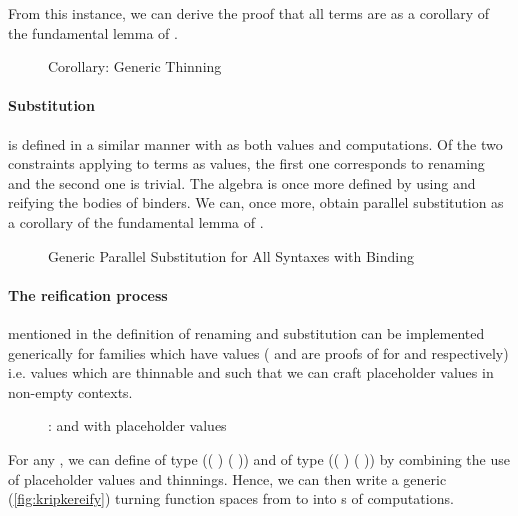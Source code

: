 From this instance, we can derive the proof that all terms are  as
a corollary of the fundamental lemma of .

\begin{figure}[h]
\caption{Corollary: Generic Thinning\label{fig:genren}}
\end{figure}

\paragraph{Substitution} is defined in a similar manner with  as both values and computations.
Of the two constraints applying to terms as values, the first one corresponds to renaming
and the second one is trivial. The algebra is once more defined by using  and
reifying the bodies of binders. We can, once more, obtain parallel substitution as a
corollary of the fundamental lemma of .

\begin{figure}[h]
\caption{Generic Parallel Substitution for All Syntaxes with Binding\label{fig:gensub}}
\end{figure}

\paragraph{The reification process} mentioned in the definition of renaming and substitution
can be implemented generically for  families which have 
values ( and  are proofs of
 for  and  respectively) i.e. values which are thinnable
and such that we can craft placeholder values in non-empty contexts.

\begin{figure}[h]
\caption{:  and with placeholder values}
\end{figure}

For any  , we can define  of
type {(( )  ( \AF{++} ))} and  of
type {(( )  ( \AF{++} ))} by combining the use
of placeholder values and thinnings. Hence, we can then write a generic 
(\cref{fig:kripkereify}) turning  function spaces from  to 
into s of  computations.

